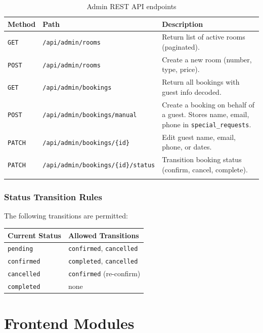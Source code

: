 \documentclass[12pt,a4paper]{report}
\begin{document}
\begin{longtable}{p{2cm} p{5.5cm} p{6cm}}
  \toprule
  \textbf{Method} & \textbf{Path} & \textbf{Description} \\
  \midrule
  \endhead
  \texttt{GET}   & \texttt{/api/admin/rooms}
                 & Return list of active rooms (paginated). \\[0.4em]
  \texttt{POST}  & \texttt{/api/admin/rooms}
                 & Create a new room (number, type, price). \\[0.4em]
  \texttt{GET}   & \texttt{/api/admin/bookings}
                 & Return all bookings with guest info decoded. \\[0.4em]
  \texttt{POST}  & \texttt{/api/admin/bookings/manual}
                 & Create a booking on behalf of a guest. Stores name, email, phone in \texttt{special\_requests}. \\[0.4em]
  \texttt{PATCH} & \texttt{/api/admin/bookings/\{id\}}
                 & Edit guest name, email, phone, or dates. \\[0.4em]
  \texttt{PATCH} & \texttt{/api/admin/bookings/\{id\}/status}
                 & Transition booking status (confirm, cancel, complete). \\
  \bottomrule
  \caption{Admin REST API endpoints}
\end{longtable}

\subsection{Status Transition Rules}

The following transitions are permitted:

\begin{center}
\begin{tabular}{ll}
  \toprule
  \textbf{Current Status} & \textbf{Allowed Transitions} \\
  \midrule
  \texttt{pending}   & \texttt{confirmed}, \texttt{cancelled} \\
  \texttt{confirmed} & \texttt{completed}, \texttt{cancelled} \\
  \texttt{cancelled} & \texttt{confirmed} (re-confirm) \\
  \texttt{completed} & none \\
  \bottomrule
\end{tabular}
\end{center}

\chapter{Frontend Modules}
\end{document}

